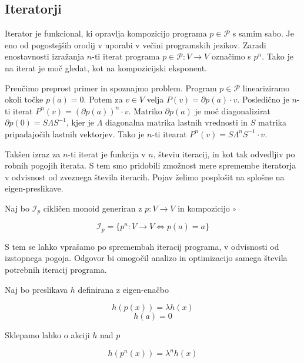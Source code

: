 \documentclass{article}
\newcommand{\dP}{\mathcal{P}}
\newcommand{\D}{\partial}
\begin{document}
  \subsection{Iteratorji}
  
  Iterator je funkcional, ki opravlja kompozicijo programa $p\in\dP$ s samim sabo. Je eno od pogostejših orodij v uporabi v večini programskih jezikov. Zaradi  enostavnosti izražanja $n$-ti iterat programa $p\in\dP:V\to V$ označimo s $p^n$. Tako je na iterat je moč gledat, kot na kompozicijski eksponent.
  
  Preučimo preprost primer in spoznajmo problem. Program $p\in\dP$ lineariziramo okoli točke $p(a)=0$. Potem za $v\in V$ velja $P(v)=\D p(a)\cdot v$. Posledično je $n$-ti iterat $P^n(v)=(\D p(a))^n\cdot v$. Matriko $\D p(a)$ je moč diagonalizirat $\D p(0)=S\Lambda S^{-1}$, kjer je $\Lambda$ diagonalna matrika lastnih vrednosti in $S$ matrika pripadajočih lastnih vektorjev. Tako je $n$-ti itearat $P^n(v)=S\Lambda^nS^{-1}\cdot v$.
  
  Takšen izraz za $n$-ti iterat je funkcija v $n$, števiu iteracij, in kot tak odvedljiv po robnih pogojih iterata. S tem smo pridobili zmožnost mere spremembe iteratorja v odvisnost od zveznega števila iteracih. Pojav želimo posplošit na splošne na eigen-preslikave.
  
  Naj bo $\mathcal{I}_p$ cikličen monoid generiran z $p:V\to V$ in kompozicijo $\circ$
  
  \begin{equation}
  \mathcal{I}_p=\{p^n:V\to V\iff p(a)=a\}
  \end{equation}
  
 S tem se lahko vprašamo po spremembah iteracij programa, v odvisnosti od izstopnega pogoja. Odgovor bi omogočil analizo in optimizacijo samega števila potrebnih iteracij programa.
  
  Naj bo preslikava $h$ definirana z eigen-enačbo
  
  \begin{equation}\label{eq:kh}
  h(p(x))=\lambda h(x)
  \end{equation}
   \begin{equation}
   h(a)=0
   \end{equation}
  
  Sklepamo lahko o akciji $h$ nad $p$
  
  \begin{equation}
  h(p^n(x))=\lambda^nh(x)
  \end{equation}
  
\end{document}
